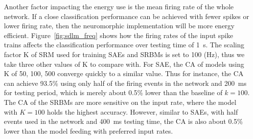 Another factor impacting the energy use is the mean firing rate of the whole network.
If a close classification performance can be achieved with fewer spikes or lower firing rate, then the neuromorphic implementation will be more energy efficient.
Figure~\ref{fig:sdlm_freq} shows how the firing rates of the input spike trains affects the classification performance over testing time of 1~s.
The scaling factor K of SRM used for training SAEs and SRBMs is set to 100 (Hz), thus we take three other values of K to compare with.
For SAE, the CA of models using K of 50, 100, 500 converge quickly to a similar value.
Thus for instance, the CA can achieve 93.5\% using only half of the firing events in the network and 200~ms for testing period, which is merely about 0.5\% lower than the baseline of $k=100$.
The CA of the SRBMs are more sensitive on the input rate, where the model with $K=100$ holds the highest accuracy.
However, similar to SAEs, with half events used in the network and 400~ms testing time, the CA is also about 0.5\% lower than the model feeding with preferred input rates.


